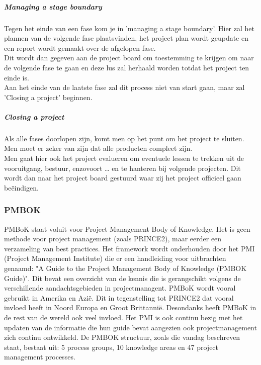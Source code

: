 \documentclass[]{article}
\begin{document}
\subparagraph{Managing a stage boundary}
Tegen het einde van een fase kom je in 'managing a stage boundary'. Hier zal het plannen van de volgende fase plaatsvinden, het project plan wordt geupdate en een report wordt gemaakt over de afgelopen fase. \\
Dit wordt dan gegeven aan de project board om toestemming te krijgen om naar de volgende fase te gaan en deze lus zal herhaald worden totdat het project ten einde is. \\
Aan het einde van de laatste fase zal dit process niet van start gaan, maar zal 'Closing a project' beginnen.
\subparagraph{Closing a project}
Als alle fases doorlopen zijn, komt men op het punt om het project te sluiten. Men moet er zeker van zijn dat alle producten compleet zijn. \\
Men gaat hier ook het project evalueren om eventuele lessen te trekken uit de vooruitgang, bestuur, enzovoort … en te hanteren bij volgende projecten. Dit wordt dan naar het project board gestuurd waar zij het project officieel gaan beëindigen.

\subsubsection{PMBOK}
PMBoK staat voluit voor Project Management Body of Knowledge. Het is geen methode voor project management (zoals PRINCE2), maar eerder een verzameling van best practices. Het framework wordt onderhouden door het PMI (Project Management Institute) die er een handleiding voor uitbrachten genaamd: "A Guide to the Project Management Body of Knowledge (PMBOK\textsuperscript{\textregistered} Guide)". Dit bevat een overzicht van de kennis die is gerangschikt volgens de verschillende aandachtsgebieden in projectmanagent. PMBoK wordt vooral gebruikt in Amerika en Azië. Dit in tegenstelling tot PRINCE2 dat vooral invloed heeft in Noord Europa en Groot Brittannië. Desondanks heeft PMBoK in de rest van de wereld ook veel invloed. Het PMI is ook continu bezig met het updaten van de informatie die hun guide bevat aangezien ook projectmanagement zich continu ontwikkeld. De PMBOK\textsuperscript{\textregistered} structuur, zoals die vandag beschreven staat, bestaat uit: 5 process groups, 10 knowledge areas en 47 project management processes.	
\end{document}
